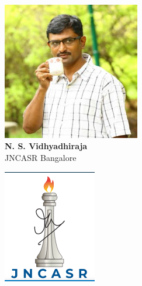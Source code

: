 \documentclass[10pt,aspectratio=169]{beamer}
\begin{document}
\begin{frame}{}
\begin{minipage}{0.3\textwidth}
	\centering
	\includegraphics[width=0.45\textwidth]{nsv.jpeg}\\
	\footnotesize{{\bf N. S. Vidhyadhiraja}\\
	JNCASR Bangalore}
\end{minipage}
\hspace*{\fill}
\begin{minipage}{0.1\textwidth}
	\includegraphics[width=\textwidth]{JNCASR.png}\\
\end{minipage}
\hspace*{\fill}

\end{frame}
\end{document}

